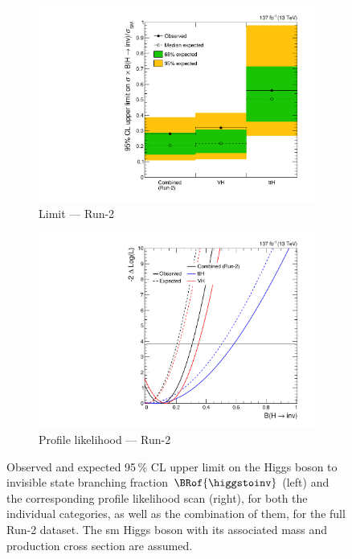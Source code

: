 \begin{figure}[htbp]
    \centering
    \begin{subfigure}[t]{0.49\textwidth}
        \includegraphics[width=\textwidth]{figures/limits/full_Run2/limit_Run2_comb_per_cat.pdf}
        \caption{Limit --- Run-2}
    \end{subfigure}
    \hfill
    \begin{subfigure}[t]{0.49\textwidth}
        \includegraphics[width=\textwidth]{figures/likelihood_scan/profile_likelihood_scan_Run2_per_cat.pdf}
        \caption{Profile likelihood --- Run-2}
    \end{subfigure}
    \caption[Observed and expected 95\,\% CL upper limit on the Higgs boson to invisible state branching fraction $\BRof{\higgstoinv}$ and the corresponding profile likelihood scan, for both the individual categories, as well as the combination of them, for the full Run-2 dataset]{Observed and expected 95\,\% CL upper limit on the Higgs boson to invisible state branching fraction $\BRof{\higgstoinv}$ (left) and the corresponding profile likelihood scan (right), for both the individual categories, as well as the combination of them, for the full Run-2 dataset. The \acrlong{sm} Higgs boson with its associated mass and production cross section are assumed.}
    \label{fig:htoinv_limit_likelihood_Run2_per_cat}
\end{figure}

